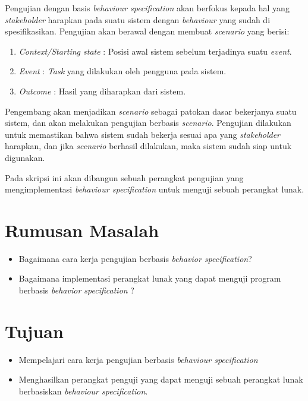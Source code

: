 \documentclass[a4paper,twoside]{article}
\begin{document}
Pengujian dengan basis \textit{behaviour specification} akan berfokus kepada hal yang \textit{stakeholder} harapkan pada suatu sistem dengan \textit{behaviour} yang sudah di spesifikasikan. Pengujian akan berawal dengan membuat \textit{scenario} yang berisi:
\begin{enumerate}
\item \textit{Context/Starting state} : Posisi awal sistem sebelum terjadinya suatu \textit{event}.
\item \textit{Event} : \textit{Task} yang dilakukan oleh pengguna pada sistem.
\item \textit{Outcome} : Hasil yang diharapkan dari sistem.
\end{enumerate}
Pengembang akan menjadikan \textit{scenario} sebagai patokan dasar bekerjanya suatu sistem, dan akan melakukan pengujian berbasis \textit{scenario}. Pengujian dilakukan untuk memastikan bahwa sistem sudah bekerja sesuai apa yang \textit{stakeholder} harapkan, dan jika \textit{scenario} berhasil dilakukan, maka sistem sudah siap untuk digunakan.

Pada skripsi ini akan dibangun sebuah perangkat pengujian yang mengimplementasi \textit{behaviour specification} untuk menguji sebuah perangkat lunak.
\section{Rumusan Masalah}
\begin{itemize}
\item Bagaimana cara kerja pengujian berbasis \textit{behavior specification}?
\item Bagaimana implementasi perangkat lunak yang dapat menguji program berbasis \textit{behavior specification} ?	
\end{itemize}
\section{Tujuan}
\begin{itemize}
\item Mempelajari cara kerja pengujian berbasis \textit{behaviour specification}
\item Menghasilkan perangkat penguji yang dapat menguji sebuah perangkat lunak berbasiskan \textit{behaviour specification}.
\end{itemize}
\end{document}
